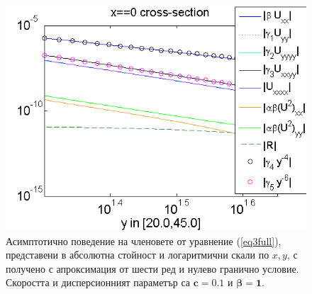 \documentclass[a4paper]{article}
\newcommand{\rf}[1]{(\ref{#1})}
\theoremstyle{remark}
\begin{document}
\begin{large}
\begin{figure}[ht]
\begin{minipage}[b]{0.95\linewidth}
	\end{minipage}
	\begin{minipage}[b]{0.95\linewidth}
		 \raggedright
		\includegraphics[width=\linewidth]{AssymptForEachTerm/bt1_c010_090/ChristovIC_AlongY_50_ZB2_bt1_c010_h020_O(h^6).png}
	\end{minipage}
	\caption{Асимптотично поведение на членовете от уравнение \rf{eq3full}, представени в абсолютна стойност и логаритмични скали по $x,y$, с получено с апроксимация от шести ред и нулево гранично условие. Скоростта и дисперсионният параметър са $\boldsymbol{c=0.1}$ и $\boldsymbol{\beta = 1}$. }
	\label{fig:assympt_beta1c01}
\end{figure}
\FloatBarrier


\end{large}
\end{document}
